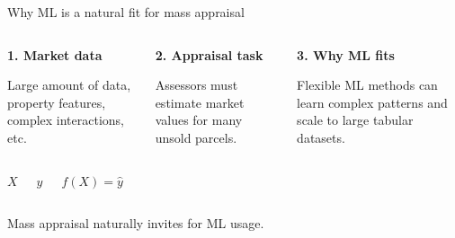 \documentclass[aspectratio=169,12pt,]{beamer}
\newcommand{\1}{\mathbf{1}}
\begin{document}
\begin{frame}{Why ML is a natural fit for mass appraisal}

\begin{columns}[T,onlytextwidth]
\begin{tcolorbox}[colback=gray!8,colframe=gray!60,arc=1mm,boxrule=0.5pt]
\centering \textbf{1. Market data}

\vspace{1.5mm}
\raggedright
Large amount of data, property features, complex interactions, etc.
\end{tcolorbox}



\begin{tcolorbox}[colback=gray!8,colframe=gray!60,arc=1mm,boxrule=0.5pt]
\centering \textbf{2. Appraisal task}

\vspace{1.5mm}
\raggedright
Assessors must estimate market values for many unsold parcels.
\end{tcolorbox}



\begin{tcolorbox}[colback=gray!8,colframe=gray!60,arc=1mm,boxrule=0.5pt]
\centering \textbf{3. Why ML fits}

\vspace{1.5mm}
\raggedright
Flexible ML methods can learn complex patterns and scale to large tabular datasets.
\end{tcolorbox}
\end{columns}

\begin{columns}[T,onlytextwidth]

\begin{center}
    $X$
\end{center}


\begin{center}
    $y$
\end{center}


\begin{center}
    $f(X) = \hat y $
\end{center}

\end{columns}


\vspace{4mm}
\begin{center}
\footnotesize {Mass appraisal naturally invites for ML usage.}

\end{center}

\end{frame}
\end{document}

